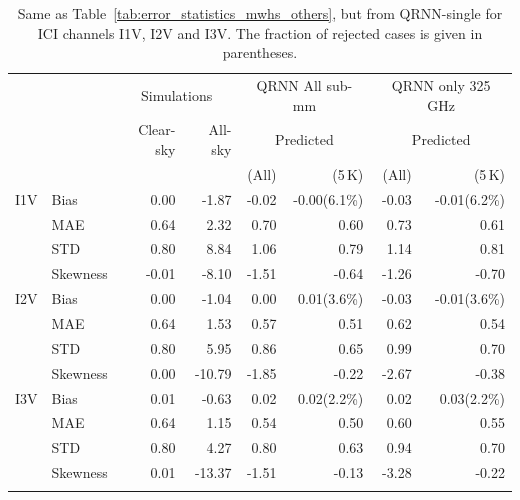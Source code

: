 \documentclass[amt, manuscript]{copernicus}
\begin{document}
\begin{table}[t]
	\caption{ Same as Table~\ref{tab:error_statistics_mwhs_others}, but from QRNN-single for ICI channels I1V, I2V and I3V. The fraction of rejected cases is given in parentheses.}
	\label{tab:error_statistics_ici}
	\begin{tabular}{llrr|rr|rr}
		\tophline
		&&\multicolumn{2}{c|}{Simulations}& \multicolumn{2}{c|}{QRNN All sub-mm}&\multicolumn{2}{c}{QRNN only 325 GHz} \\
		\cline{3-8}
		&&Clear-sky &   All-sky &  \multicolumn{2}{c|}{Predicted}&  \multicolumn{2}{c}{Predicted}   \\
		&&			   &			&	(All) & (5\,K) &	(All) & (5\,K)\\
		\middlehline
		
		I1V&  Bias      &  0.00 & -1.87 & -0.02 & -0.00(6.1\%) & -0.03 & -0.01(6.2\%) \\
		&MAE       		&  0.64 &  2.32 &  0.70 &  0.60  &   0.73 &  0.61 \\
		&STD       		&  0.80 &  8.84 &  1.06 &  0.79  &  1.14 &  0.81 \\
		&Skewness 		& -0.01 & -8.10 & -1.51 & -0.64  & -1.26 & -0.70\\
		\middlehline
		I2V & Bias      & 0.00 &  -1.04 &  0.00 &  0.01(3.6\%) & -0.03 & -0.01(3.6\%)  \\
		&MAE       		& 0.64 &   1.53 &  0.57 &  0.51 &  0.62 &  0.54\\
		&STD       		& 0.80 &   5.95 &  0.86 &  0.65 &  0.99 &  0.70\\
		&Skewness 		& 0.00 & -10.79 & -1.85 & -0.22 & -2.67 & -0.38 \\
		\middlehline	
		I3V & Bias      & 0.01 &  -0.63 &  0.02 &  0.02(2.2\%)&  0.02 &  0.03(2.2\%)  \\
		&MAE       		& 0.64 &   1.15 &  0.54 &  0.50  &  0.60 &  0.55\\
		&STD       		& 0.80 &   4.27 &  0.80 &  0.63  &  0.94 &  0.70\\
		&Skewness 		& 0.01 & -13.37 & -1.51 & -0.13  & -3.28 & -0.22\\
		\bottomhline
	\end{tabular}
	\belowtable{} %
\end{table}



\noappendix       %
\end{document}
